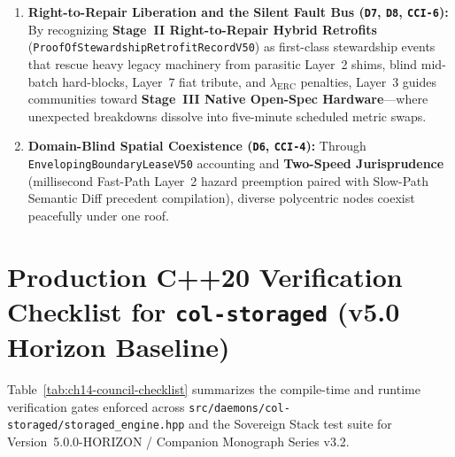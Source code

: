 \begin{enumerate}
    \item \textbf{Right-to-Repair Liberation and the Silent Fault Bus (\texttt{D7}, \texttt{D8}, \texttt{CCI-6}):} By recognizing \textbf{Stage~II Right-to-Repair Hybrid Retrofits} (\texttt{ProofOfStewardshipRetrofitRecordV50}) as first-class stewardship events that rescue heavy legacy machinery from parasitic Layer~2 shims, blind mid-batch hard-blocks, Layer~7 fiat tribute, and $\lambda_{\mathrm{ERC}}$ penalties, Layer~3 guides communities toward \textbf{Stage~III Native Open-Spec Hardware}---where unexpected breakdowns dissolve into five-minute scheduled metric swaps.
    \item \textbf{Domain-Blind Spatial Coexistence (\texttt{D6}, \texttt{CCI-4}):} Through \texttt{EnvelopingBoundaryLeaseV50} accounting and \textbf{Two-Speed Jurisprudence} (millisecond Fast-Path Layer~2 hazard preemption paired with Slow-Path Semantic Diff precedent compilation), diverse polycentric nodes coexist peacefully under one roof.
\end{enumerate}

\section{Production C++20 Verification Checklist for \texttt{col-storaged} (v5.0 Horizon Baseline)}
\label{sec:ch14-verification-checklist}

Table~\ref{tab:ch14-council-checklist} summarizes the compile-time and runtime verification gates enforced across \texttt{src/daemons/col-storaged/storaged\_engine.hpp} and the Sovereign Stack test suite for Version~5.0.0-HORIZON / Companion Monograph Series v3.2.

